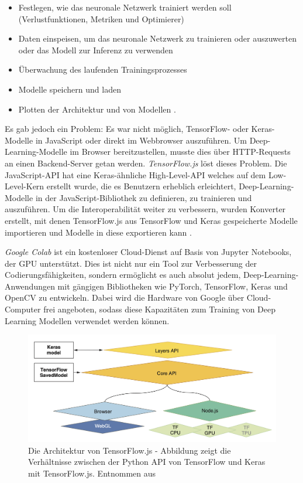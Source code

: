 \begin{itemize}
     \item Festlegen, wie das neuronale Netzwerk trainiert werden soll (Verlustfunktionen, Metriken und Optimierer)
     \item Daten einspeisen, um das neuronale Netzwerk zu trainieren oder auszuwerten oder das Modell zur Inferenz zu verwenden
     \item Überwachung des laufenden Trainingsprozesses
     \item Modelle speichern und laden
     \item Plotten der Architektur und von Modellen \cite[29]{cai2020deep}.
 \end{itemize}





Es gab jedoch ein Problem: Es war nicht möglich, TensorFlow- oder Keras-Modelle in JavaScript oder direkt im Webbrowser auszuführen. Um Deep-Learning-Modelle im Browser bereitzustellen, musste dies über HTTP-Requests an einen Backend-Server getan werden. \textit{TensorFlow.js} löst dieses Problem. Die JavaScript-API hat eine Keras-ähnliche High-Level-API welches auf dem Low-Level-Kern erstellt wurde, die es Benutzern erheblich erleichtert, Deep-Learning-Modelle in der JavaScript-Bibliothek zu definieren, zu trainieren und auszuführen. Um die Interoperabilität weiter zu verbessern, wurden Konverter erstellt, mit denen TensorFlow.js aus TensorFlow und Keras gespeicherte Modelle importieren und Modelle in diese exportieren kann \cite[29]{cai2020deep}.


\textit{Google Colab} ist ein kostenloser Cloud-Dienst auf Basis von Jupyter Notebooks, der GPU unterstützt. Dies ist nicht nur ein Tool zur Verbesserung der Codierungsfähigkeiten, sondern ermöglicht es auch absolut jedem, Deep-Learning-Anwendungen mit gängigen Bibliotheken wie PyTorch, TensorFlow, Keras und OpenCV zu entwickeln. Dabei wird die Hardware von Google über Cloud-Computer frei angeboten, sodass diese Kapazitäten zum Training von Deep Learning Modellen verwendet werden können. 

 \begin{figure}[H]
     \centering
     \includegraphics[width=12cm]{kapitel5/tfjsarch.png}
     \caption[Die Architektur von TensorFlow.js]{Die Architektur von TensorFlow.js - Abbildung zeigt die Verhältnisse zwischen der Python API von TensorFlow und Keras mit TensorFlow.js. Entnommen aus \cite[30]{cai2020deep}}
     \label{Kap5:tfjsarch}
 \end{figure}
 


